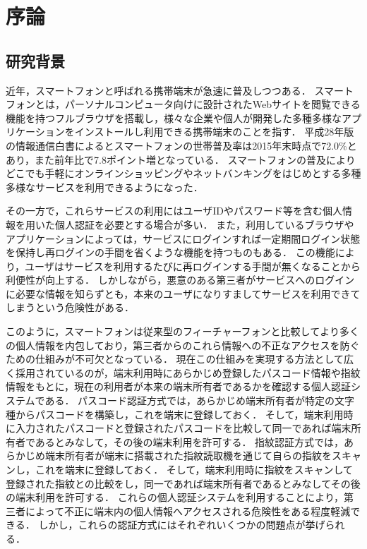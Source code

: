 \chapter{序論}

\section{研究背景}
近年，スマートフォンと呼ばれる携帯端末が急速に普及しつつある．
スマートフォンとは，パーソナルコンピュータ向けに設計されたWebサイトを閲覧できる機能を持つフルブラウザを搭載し，様々な企業や個人が開発した多種多様なアプリケーションをインストールし利用できる携帯端末のことを指す\cite{1-smartphone}．
平成28年版の情報通信白書によるとスマートフォンの世帯普及率は2015年末時点で72.0\%とあり，また前年比で7.8ポイント増となっている\cite{1-spread}．
スマートフォンの普及によりどこでも手軽にオンラインショッピングやネットバンキングをはじめとする多種多様なサービスを利用できるようになった．

その一方で，これらサービスの利用にはユーザIDやパスワード等を含む個人情報を用いた個人認証を必要とする場合が多い．
また，利用しているブラウザやアプリケーションによっては，サービスにログインすれば一定期間ログイン状態を保持し再ログインの手間を省くような機能を持つものもある．
この機能により，ユーザはサービスを利用するたびに再ログインする手間が無くなることから利便性が向上する．
しかしながら，悪意のある第三者がサービスへのログインに必要な情報を知らずとも，本来のユーザになりすましてサービスを利用できてしまうという危険性がある．

このように，スマートフォンは従来型のフィーチャーフォンと比較してより多くの個人情報を内包しており，第三者からのこれら情報への不正なアクセスを防ぐための仕組みが不可欠となっている．
現在この仕組みを実現する方法として広く採用されているのが，端末利用時にあらかじめ登録したパスコード情報や指紋情報をもとに，現在の利用者が本来の端末所有者であるかを確認する個人認証システムである．
パスコード認証方式では，あらかじめ端末所有者が特定の文字種からパスコードを構築し，これを端末に登録しておく．
そして，端末利用時に入力されたパスコードと登録されたパスコードを比較して同一であれば端末所有者であるとみなして，その後の端末利用を許可する．
指紋認証方式では，あらかじめ端末所有者が端末に搭載された指紋読取機を通じて自らの指紋をスキャンし，これを端末に登録しておく．
そして，端末利用時に指紋をスキャンして登録された指紋との比較をし，同一であれば端末所有者であるとみなしてその後の端末利用を許可する．
これらの個人認証システムを利用することにより，第三者によって不正に端末内の個人情報へアクセスされる危険性をある程度軽減できる．
しかし，これらの認証方式にはそれぞれいくつかの問題点が挙げられる．

